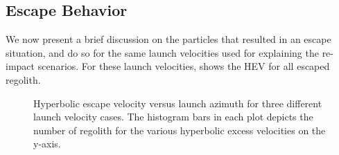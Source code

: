 \subsection{Escape Behavior}
\label{subsec:escape_behavior_noSP}
We now present a brief discussion on the particles that resulted in an escape situation, and do so for the same launch velocities used for explaining the re-impact scenarios. For these launch velocities,  shows the \gls{HEV} for all escaped regolith.
\begin{figure}[htb]
\centering
\captionsetup{justification=centering}

\caption{Hyperbolic escape velocity versus launch azimuth for three different launch velocity cases. The histogram bars in each plot depicts the number of regolith for the various hyperbolic excess velocities on the y-axis.}
\label{fig:hev_escapeHist_noSP}
\end{figure}
